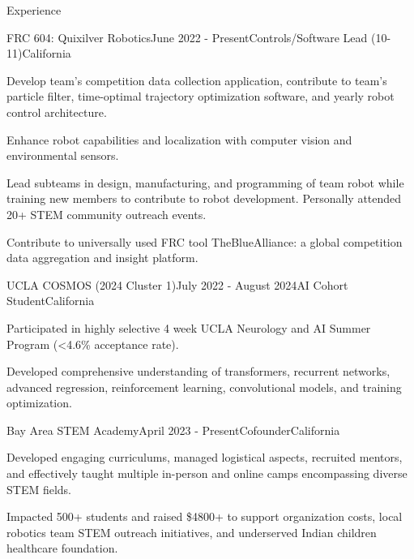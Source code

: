 \documentclass[
  11pt, %
]{public/resume/resume} %
\begin{document}
\sloppy


\begin{rSection}{Experience}


  \begin{rSubsection}{FRC 604: Quixilver Robotics}{June 2022 - Present}{Controls/Software Lead (10-11)}{California}
    
    \item Develop team's competition data collection application, contribute to team's particle filter, time-optimal trajectory optimization software, and yearly robot control architecture.
    
    \item Enhance robot capabilities and localization with computer vision and environmental sensors.
    
    \item Lead subteams in design, manufacturing, and programming of team robot while training new members to contribute to robot development. Personally attended 20+ STEM community outreach events.
    
    \item Contribute to universally used FRC tool TheBlueAlliance: a global competition data aggregation and insight platform.
    
  \end{rSubsection}
        
  \begin{rSubsection}{UCLA COSMOS (2024 Cluster 1)}{July 2022 - August 2024}{AI Cohort Student}{California}
    
    \item Participated in highly selective 4 week UCLA Neurology and AI Summer Program (<4.6\% acceptance rate).
    
    \item Developed comprehensive understanding of transformers, recurrent networks, advanced regression, reinforcement learning, convolutional models, and training optimization.
    
  \end{rSubsection}
        
  \begin{rSubsection}{Bay Area STEM Academy}{April 2023 - Present}{Cofounder}{California}
    
    \item Developed engaging curriculums, managed logistical aspects, recruited mentors, and effectively taught multiple in-person and online camps encompassing diverse STEM fields.
    
    \item Impacted 500+ students and raised \$4800+ to support organization costs, local robotics team STEM outreach initiatives, and underserved Indian children healthcare foundation.
    
  \end{rSubsection}
        
	
\end{rSection}
\end{document}
